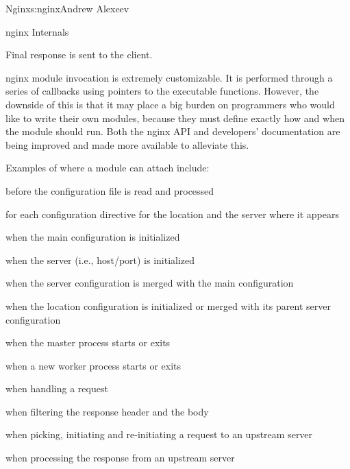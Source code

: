 \begin{aosachapter}{Nginx}{s:nginx}{Andrew Alexeev}
\begin{aosasect1}{nginx Internals}
\begin{aosaenumerate}
\item Final response is sent to the client.

\end{aosaenumerate}

nginx module invocation is extremely customizable. It is performed
through a series of callbacks using pointers to the executable
functions. However, the downside of this is that it may place a big
burden on programmers who would like to write their own modules,
because they must define exactly how and when the module should
run. Both the nginx API and developers' documentation are being
improved and made more available to alleviate this.

Examples of where a module can attach include:

\begin{aosaitemize}

\item before the configuration file is read and processed

\item for each configuration directive for the location and the server
  where it appears

\item when the main configuration is initialized

\item when the server (i.e., host/port) is initialized

\item when the server configuration is merged with the main
  configuration

\item when the location configuration is initialized or merged with
  its parent server configuration

\item when the master process starts or exits

\item when a new worker process starts or exits

\item when handling a request

\item when filtering the response header and the body

\item when picking, initiating and re-initiating a request to an
  upstream server

\item when processing the response from an upstream server


\end{aosaitemize}
\end{aosasect1}
\end{aosachapter}
